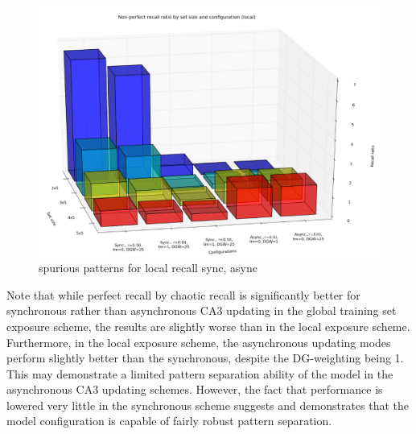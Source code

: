 \begin{figure}
    \centering
    \includegraphics[width=13cm]{fig/i-iters/local-recall-spurious}
    \caption{spurious patterns for local recall sync, async}
    \label{fig:local-recall-spurious}
\end{figure}

Note that while perfect recall by chaotic recall is significantly better for synchronous rather than asynchronous CA3 updating in the global training set exposure scheme, the results are slightly worse than in the local exposure scheme. Furthermore, in the local exposure scheme, the asynchronous updating modes perform slightly better than the synchronous, despite the DG-weighting being 1. This may demonstrate a limited pattern separation ability of the model in the asynchronous CA3 updating schemes. However, the fact that performance is lowered very little in the synchronous scheme suggests and demonstrates that the model configuration is capable of fairly robust pattern separation.


